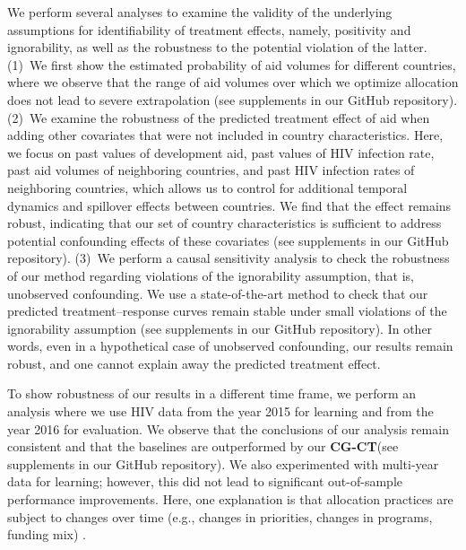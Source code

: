 \documentclass[sigconf]{acmart}
\newcommand{\framework}{\textbf{\mbox{CG-CT}}\xspace}
\begin{document}
We perform several analyses to examine the validity of the underlying assumptions for identifiability of treatment effects, namely, positivity and ignorability, as well as the robustness to the potential violation of the latter. (1)~We first show the estimated probability of aid volumes for different countries, where we observe that the range of aid volumes over which we optimize allocation does not lead to severe extrapolation (see supplements in our GitHub repository). (2)~We examine the robustness of the predicted treatment effect of aid when adding other covariates that were not included in country characteristics. Here, we focus on past values of development aid, past values of HIV infection rate, past aid volumes of neighboring countries, and past HIV infection rates of neighboring countries, which allows us to control for additional temporal dynamics and spillover effects between countries. We find that the effect remains robust, indicating that our set of country characteristics is sufficient to address potential confounding effects of these covariates (see supplements in our GitHub repository). (3)~We perform a causal sensitivity analysis to check the robustness of our method regarding violations of the ignorability assumption, that is, unobserved confounding. We use a state-of-the-art method \cite{Jesson.2022,Frauen.2023,Frauen.2024} to check that our predicted treatment--response curves remain stable under small violations of the ignorability assumption (see supplements in our GitHub repository). In other words, even in a hypothetical case of unobserved confounding, our results remain robust, and one cannot explain away the predicted treatment effect.  

To show robustness of our results in a different time frame, we perform an analysis where we use HIV data from the year 2015 for learning and from the year 2016 for evaluation. We observe that the conclusions of our analysis remain consistent and that the baselines are outperformed by our \framework (see supplements in our GitHub repository). We also experimented with multi-year data for learning; however, this did not lead to significant out-of-sample performance improvements. Here, one explanation is that allocation practices are subject to changes over time (e.g., changes in priorities, changes in programs, funding mix) \cite{Avila2013}.  
\end{document}
